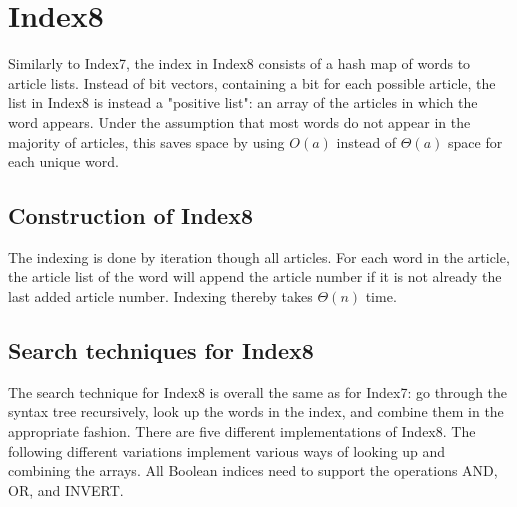 \section{Index8}
Similarly to Index7, the index in Index8 consists of a hash map of words to article lists. Instead of bit vectors, containing a bit for each possible article, the list in Index8 is instead a "positive list": an array of the articles in which the word appears. Under the assumption that most words do not appear in the majority of articles, this saves space by using $O(a)$ instead of $\Theta(a)$ space for each unique word. 


\subsection{Construction of Index8}
The indexing is done by iteration though all articles. For each word in the article, the article list of the word will append the article number if it is not already the last added article number. Indexing thereby takes $\Theta(n)$ time.

\subsection{Search techniques for Index8}

The search technique for Index8 is overall the same as for Index7: go through the syntax tree recursively, look up the words in the index, and combine them in the appropriate fashion. There are five different implementations of Index8. The following different variations implement various ways of looking up and combining the arrays. All Boolean indices need to support the operations AND, OR, and INVERT. 

